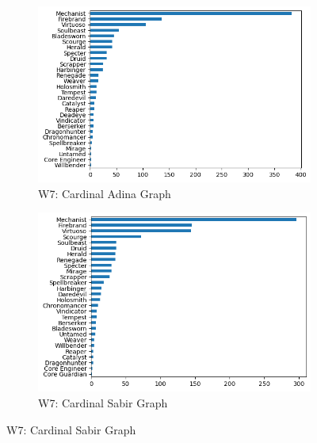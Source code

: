 \documentclass[12pt,a4paper]{article}
\begin{document}
\begin{figure}[h!]
        \begin{subfigure}{0.5\textwidth}
            \centering
            \includegraphics[scale=0.4]{adina_graph.png}
            \caption{\small W7: Cardinal Adina Graph}
        \end{subfigure}%
        \begin{subfigure}{0.5\textwidth}
            \centering
            \includegraphics[scale=0.4]{sabir_graph.png}
            \caption{\small W7: Cardinal Sabir Graph}
        \end{subfigure}
    \end{figure}

    \newpage
\end{document}
